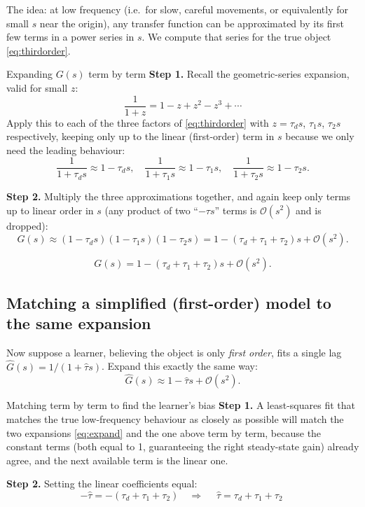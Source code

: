 \documentclass[11pt,a4paper]{article}
\begin{document}
The idea: at low frequency (i.e.\ for slow, careful movements, or equivalently
for small $s$ near the origin), any transfer function can be approximated by
its first few terms in a power series in $s$. We compute that series for the
true object \eqref{eq:thirdorder}.

\begin{stepbox}{Expanding $G(s)$ term by term}
\textbf{Step 1.} Recall the geometric-series expansion, valid for small $z$:
\[
\frac{1}{1+z} = 1 - z + z^2 - z^3 + \cdots
\]
Apply this to each of the three factors of \eqref{eq:thirdorder} with
$z=\tau_d s$, $\tau_1 s$, $\tau_2 s$ respectively, keeping only up to the
linear (first-order) term in $s$ because we only need the leading behaviour:
\[
\frac{1}{1+\tau_d s} \approx 1-\tau_d s, \quad
\frac{1}{1+\tau_1 s} \approx 1-\tau_1 s, \quad
\frac{1}{1+\tau_2 s} \approx 1-\tau_2 s.
\]

\textbf{Step 2.} Multiply the three approximations together, and again keep
only terms up to linear order in $s$ (any product of two ``$-\tau s$'' terms
is $\mathcal O(s^2)$ and is dropped):
\[
G(s) \approx (1-\tau_d s)(1-\tau_1 s)(1-\tau_2 s)
= 1 - (\tau_d+\tau_1+\tau_2)s + \mathcal O(s^2).
\]
\end{stepbox}

\begin{equation}
G(s) = 1 - (\tau_d+\tau_1+\tau_2)s + \mathcal O(s^2).
\label{eq:expand}
\end{equation}

\subsection{Matching a simplified (first-order) model to the same expansion}

Now suppose a learner, believing the object is only \emph{first order}, fits
a single lag $\hat G(s)=1/(1+\hat\tau s)$. Expand this exactly the same way:
\[
\hat G(s) \approx 1-\hat\tau s+\mathcal O(s^2).
\]

\begin{stepbox}{Matching term by term to find the learner's bias}
\textbf{Step 1.} A least-squares fit that matches the true low-frequency
behaviour as closely as possible will match the two expansions
\eqref{eq:expand} and the one above term by term, because the constant terms
(both equal to 1, guaranteeing the right steady-state gain) already agree, and
the next available term is the linear one.

\textbf{Step 2.} Setting the linear coefficients equal:
\[
-\hat\tau = -(\tau_d+\tau_1+\tau_2) \quad\Longrightarrow\quad
\boxed{\;\hat\tau = \tau_d + \tau_1 + \tau_2\;}
\]
\end{stepbox}
\end{document}
